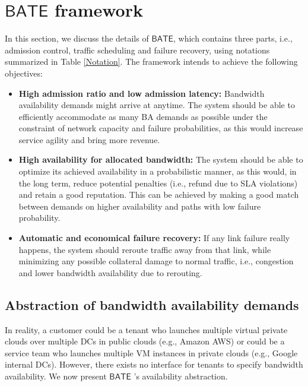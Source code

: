 \documentclass[sigconf]{acmart}
\begin{document}
\section{$\mathsf{BATE}$ framework}\label{HATE}
In this section, we discuss the details of $\mathsf{BATE}$, which contains three parts, i.e., admission control, traffic scheduling and failure recovery, using notations summarized in Table \ref{Notation}. 
The framework intends to achieve the following objectives: 
 \begin{itemize}
\item \textbf{High admission ratio and low admission latency:}  
  Bandwidth availability demands might arrive at anytime. 
  The system should be able to efficiently accommodate as many BA demands as possible under the constraint of network capacity and failure probabilities, as this would increase service agility and bring more revenue. %
\item \textbf{High availability for allocated bandwidth:}
The system should be able to optimize its achieved availability in a probabilistic manner, 
as this would, in the long term, reduce potential penalties (i.e., refund due to SLA violations) and retain a good reputation. This can be achieved by making a good match between demands on higher availability and paths with low failure probability.
\item \textbf{Automatic and economical failure recovery:}
If any link failure really happens, the system should reroute traffic away from that link, 
while minimizing any possible collateral damage to normal traffic, i.e., congestion and lower bandwidth availability due to rerouting.
%
\end{itemize}

\subsection{Abstraction of bandwidth availability demands}
In reality, a customer could be a tenant who launches multiple virtual private clouds over  multiple DCs in public clouds (e.g., Amazon AWS) or could be a service team who launches multiple VM instances in private clouds (e.g., Google internal DCs).
However, there exists no interface for tenants to specify bandwidth availability.
We now present $\mathsf{BATE}$ 's availability abstraction.
\end{document}
